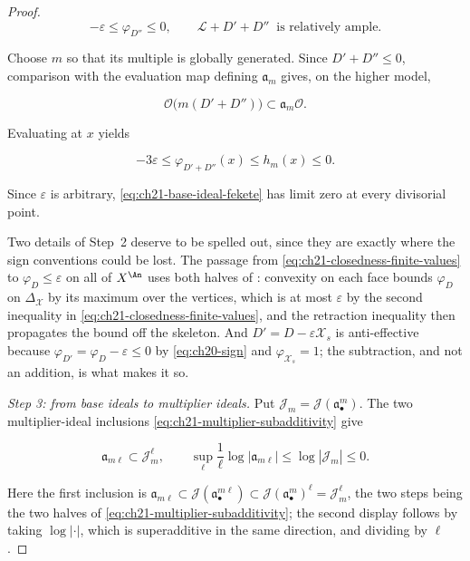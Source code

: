 \begin{proof}
\begin{equation}
\label{eq:ch21-closedness-ample-perturbation}
        -\varepsilon\leq\varphi_{D''}\leq0,
        \qquad
        \mathcal L+D'+D''\
        \text{ is relatively ample}.
\end{equation}

Choose $m$ so that its multiple is globally generated.  Since
$D'+D''\leq0$, comparison with the evaluation map defining
$\mathfrak a_m$ gives, on the higher model,

\[
       \mathcal O\bigl(m(D'+D'')\bigr)
       \subset \mathfrak a_m\mathcal O.
\]

Evaluating at $x$ yields

\begin{equation}
\label{eq:ch21-closedness-base-bound}
             -3\varepsilon
             \leq\varphi_{D'+D''}(x)
             \leq h_m(x)\leq0.
\end{equation}

Since $\varepsilon$ is arbitrary,
\eqref{eq:ch21-base-ideal-fekete} has limit zero at every divisorial point.

Two details of Step~2 deserve to be spelled out, since they are exactly
where the sign conventions could be lost.  The passage from
\eqref{eq:ch21-closedness-finite-values} to $\varphi_D\leq\varepsilon$
on all of $X^{\An}$ uses both halves of
: convexity on each face bounds
$\varphi_D$ on $\Delta_{\mathcal X}$ by its maximum over the vertices,
which is at most $\varepsilon$ by the second inequality in
\eqref{eq:ch21-closedness-finite-values}, and the retraction inequality then
propagates the bound off the skeleton.  And $D'=D-\varepsilon\mathcal X_s$
is anti-effective because $\varphi_{D'}=\varphi_D-\varepsilon\leq0$ by
\eqref{eq:ch20-sign} and $\varphi_{\mathcal X_s}=1$; the subtraction, and
not an addition, is what makes it so.

\emph{Step 3: from base ideals to multiplier ideals.}
Put $\mathcal J_m=\mathcal J(\mathfrak a_\bullet^m)$.  The two
multiplier-ideal inclusions
\eqref{eq:ch21-multiplier-subadditivity} give

\begin{equation}
\label{eq:ch21-closedness-multiplier-bound}
       \mathfrak a_{m\ell}\subset\mathcal J_m^\ell,
       \qquad
       \sup_{\ell}\frac1\ell\log|\mathfrak a_{m\ell}|
       \leq\log|\mathcal J_m|\leq0.
\end{equation}

Here the first inclusion is
$\mathfrak a_{m\ell}\subset\mathcal J(\mathfrak a_\bullet^{m\ell})\subset
\mathcal J(\mathfrak a_\bullet^{m})^{\ell}=\mathcal J_m^\ell$, the two
steps being the two halves of
\eqref{eq:ch21-multiplier-subadditivity}; the second display follows by
taking $\log|\cdot|$, which is superadditive in the same direction, and
dividing by $\ell$.


\end{proof}
